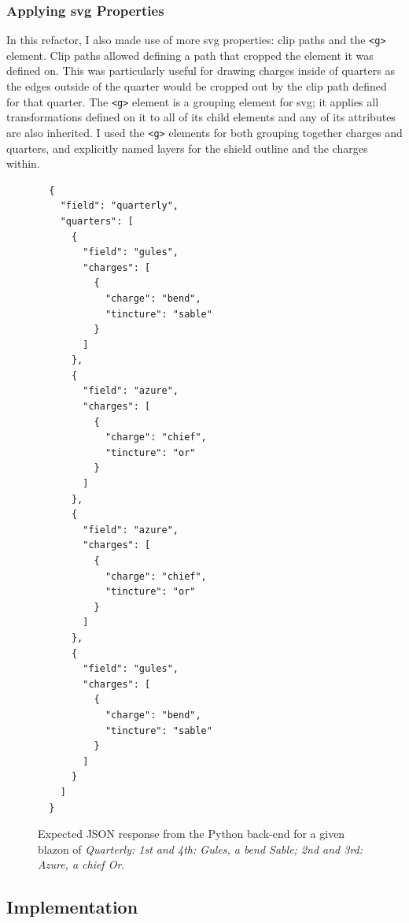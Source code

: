 \documentclass[nobib, a4paper, twoside, justified]{tufte-book}
\makeatletter
\newcommand{\svg}{\gls{svg}\@\xspace}
\newcommand{\charges}{\glspl{charge}\@\xspace}
\newcommand{\quarter}{\gls{quarter}\@\xspace}
\newcommand{\quarters}{\glspl{quarter}\@\xspace}
\newcommand{\blazon}{\gls{blazon}\@\xspace}
\makeatother
\begin{document}
\subsubsection{Applying \svg Properties}%
\label{ssub:using_svg_for_great_good}

In this refactor, I also made use of more \svg properties: clip paths and the \texttt{<g>} element.
Clip paths allowed defining a path that cropped the element it was defined on. This was
particularly useful for drawing \charges inside of \quarters as the edges outside of the \quarter
would be cropped out by the clip path defined for that \quarter. The \texttt{<g>} element is a
grouping element for \svg; it applies all transformations defined on it to all of its child
elements and any of its attributes are also inherited. I used the \texttt{<g>} elements for both
grouping together charges and quarters, and explicitly named layers for the shield outline and the
\charges within.

\begin{figure}[h!]
  \begin{verbatim}
  {
    "field": "quarterly",
    "quarters": [
      {
        "field": "gules",
        "charges": [
          {
            "charge": "bend",
            "tincture": "sable"
          }
        ]
      },
      {
        "field": "azure",
        "charges": [
          {
            "charge": "chief",
            "tincture": "or"
          }
        ]
      },
      {
        "field": "azure",
        "charges": [
          {
            "charge": "chief",
            "tincture": "or"
          }
        ]
      },
      {
        "field": "gules",
        "charges": [
          {
            "charge": "bend",
            "tincture": "sable"
          }
        ]
      }
    ]
  }
  \end{verbatim}
  \caption{Expected JSON response from the Python back-end for a given \blazon of
  \textit{Quarterly: 1st and 4th: Gules, a bend Sable; 2nd and 3rd: Azure, a chief Or}.}%
  \label{fig:quarterly_json_output}
\end{figure}

\pagebreak%

\subsection{Implementation}%
\label{sub:nd_design_implementation}

\end{document}
